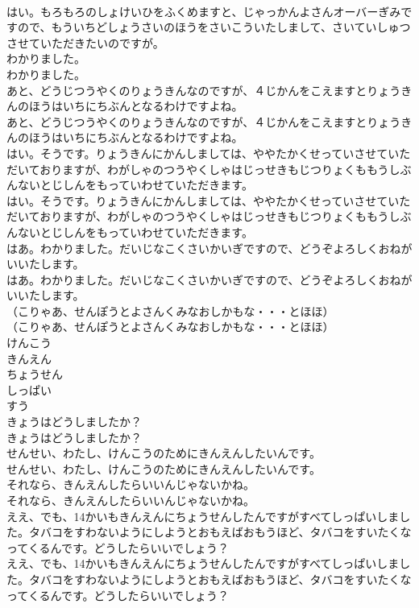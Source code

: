 \documentclass[8pt]{extreport}
\begin{document}
\begin{CJK}{UTF8}{min}
\\	はい。もろもろのしょけいひをふくめますと、じゃっかんよさんオーバーぎみですので、もういちどしょうさいのほうをさいこういたしまして、さいていしゅつさせていただきたいのですが。
\\	わかりました。
\\	わかりました。
\\	あと、どうじつうやくのりょうきんなのですが、４じかんをこえますとりょうきんのほうはいちにちぶんとなるわけですよね。
\\	あと、どうじつうやくのりょうきんなのですが、４じかんをこえますとりょうきんのほうはいちにちぶんとなるわけですよね。
\\	はい。そうです。りょうきんにかんしましては、ややたかくせっていさせていただいておりますが、わがしゃのつうやくしゃはじっせきもじつりょくももうしぶんないとじしんをもっていわせていただきます。
\\	はい。そうです。りょうきんにかんしましては、ややたかくせっていさせていただいておりますが、わがしゃのつうやくしゃはじっせきもじつりょくももうしぶんないとじしんをもっていわせていただきます。
\\	はあ。わかりました。だいじなこくさいかいぎですので、どうぞよろしくおねがいいたします。
\\	はあ。わかりました。だいじなこくさいかいぎですので、どうぞよろしくおねがいいたします。
\\	（こりゃあ、せんぽうとよさんくみなおしかもな・・・とほほ）
\\	（こりゃあ、せんぽうとよさんくみなおしかもな・・・とほほ）
\\	けんこう
\\	きんえん
\\	ちょうせん
\\	しっぱい
\\	すう
\\	きょうはどうしましたか？
\\	きょうはどうしましたか？
\\	せんせい、わたし、けんこうのためにきんえんしたいんです。
\\	せんせい、わたし、けんこうのためにきんえんしたいんです。
\\	それなら、きんえんしたらいいんじゃないかね。
\\	それなら、きんえんしたらいいんじゃないかね。
\\	ええ、でも、14かいもきんえんにちょうせんしたんですがすべてしっぱいしました。タバコをすわないようにしようとおもえばおもうほど、タバコをすいたくなってくるんです。どうしたらいいでしょう？
\\	ええ、でも、14かいもきんえんにちょうせんしたんですがすべてしっぱいしました。タバコをすわないようにしようとおもえばおもうほど、タバコをすいたくなってくるんです。どうしたらいいでしょう？

\end{CJK}
\end{document}
